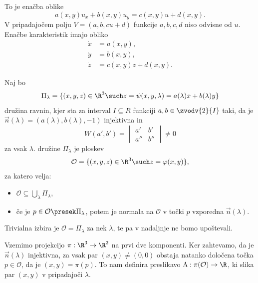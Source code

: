 

To je enačba oblike
\[
  a(x, y) u_x + b(x, y) u_y = c(x, y) u + d(x, y).
\]
V pripadajočem polju $V = (a, b, cu+d)$ funkcije $a, b, c, d$ niso odvisne od
$u$.
Enačbe karakteristik imajo obliko
\begin{align*}
  \dot{x} &= a(x, y), \\
  \dot{y} &= b(x, y), \\
  \dot{z} &= c(x, y) z + d(x, y).
\end{align*}



Naj bo
\[
	\Pi_\lambda = \{(x, y, z) \in \R^3 \such z = \psi(x, y, \lambda) = a(\lambda)
	x + b(\lambda) y\}
\]
družina ravnin, kjer sta za interval $I \subseteq R$ funkciji $a, b \in
\zvodv{2}{I}$ taki, da je $\vec{n}(\lambda) = (a(\lambda), b(\lambda), -1)$
injektivna in
\[
	W(a', b') =
	\begin{vmatrix}
		a' & b' \\ a'' & b''
	\end{vmatrix}
	\ne 0
\]
za vsak $\lambda$.
 družine $\Pi_\lambda$ je ploskev
\[
	\mathcal{O} = \{(x, y, z) \in \R^3 \such z = \varphi(x,y)\},
\]
za katero velja:
\begin{itemize}
\item $\mathcal{O} \subseteq \bigcup_\lambda \Pi_\lambda$,
\item če je $p \in \mathcal{O} \presek \Pi_\lambda$, potem je normala na
	$\mathcal{O}$ v točki $p$ vzporedna $\vec{n}(\lambda)$.
\end{itemize}
Trivialna izbira je $\mathcal{O} = \Pi_\lambda$ za nek $\lambda$, te pa v
nadaljnje ne bomo upoštevali.


Vzemimo projekcijo $\pi : \R^3 \to \R^2$ na prvi dve komponenti.
Ker zahtevamo, da je $\vec{n}(\lambda)$ injektivna, za vsak par $(x, y) \ne
(0,0)$ obstaja natanko določena točka $p \in \mathcal{O}$, da je $(x, y) =
\pi(p)$.
To nam definira preslikavo $\Lambda : \pi(\mathcal{O}) \to \R$, ki slika par
$(x, y)$ v pripadajoči $\lambda$.


